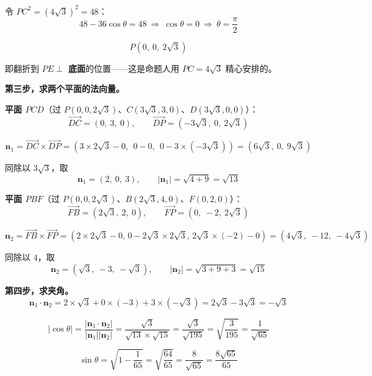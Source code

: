 \begin{answer}
令 $PC^{2}=\left(4\sqrt3\right)^{2}=48$：
\nopagebreak[4]
\[48-36\cos\theta=48\ \Longrightarrow\ \cos\theta=0\ \Longrightarrow\ \theta=\frac\pi2\]

\nopagebreak[4]
\[\boxed{P\left(0,\ 0,\ 2\sqrt3\right)}\]

即翻折到 \textbf{$PE\perp$ 底面}的位置——这是命题人用 $PC=4\sqrt3$ 精心安排的。

\textbf{第三步，求两个平面的法向量。}

\textbf{平面 $PCD$}（过 $P(0,0,2\sqrt3)$、$C\left(3\sqrt3,3,0\right)$、$D\left(3\sqrt3,0,0\right)$）：
\nopagebreak[4]
\[\overrightarrow{DC}=(0,\ 3,\ 0),\qquad\overrightarrow{DP}=\left(-3\sqrt3,\ 0,\ 2\sqrt3\right)\]

\nopagebreak[4]
\[\boldsymbol n_1=\overrightarrow{DC}\times\overrightarrow{DP}=\left(3\times2\sqrt3-0,\ \ 0-0,\ \ 0-3\times\left(-3\sqrt3\right)\right)=\left(6\sqrt3,\ 0,\ 9\sqrt3\right)\]

同除以 $3\sqrt3$，取
\nopagebreak[4]
\[\boldsymbol n_1=(2,\ 0,\ 3),\qquad\left|\boldsymbol n_1\right|=\sqrt{4+9}=\sqrt{13}\]

\textbf{平面 $PBF$}（过 $P(0,0,2\sqrt3)$、$B\left(2\sqrt3,4,0\right)$、$F(0,2,0)$）：
\nopagebreak[4]
\[\overrightarrow{FB}=\left(2\sqrt3,\ 2,\ 0\right),\qquad\overrightarrow{FP}=\left(0,\ -2,\ 2\sqrt3\right)\]

\nopagebreak[4]
\[\boldsymbol n_2=\overrightarrow{FB}\times\overrightarrow{FP}=\left(2\times2\sqrt3-0,\,0-2\sqrt3\times2\sqrt3,\,2\sqrt3\times(-2)-0\right)=\left(4\sqrt3,\ -12,\ -4\sqrt3\right)\]

同除以 $4$，取
\nopagebreak[4]
\[\boldsymbol n_2=\left(\sqrt3,\ -3,\ -\sqrt3\right),\qquad\left|\boldsymbol n_2\right|=\sqrt{3+9+3}=\sqrt{15}\]

\textbf{第四步，求夹角。}
\nopagebreak[4]
\[\boldsymbol n_1\cdot\boldsymbol n_2=2\times\sqrt3+0\times(-3)+3\times\left(-\sqrt3\right)=2\sqrt3-3\sqrt3=-\sqrt3\]

\nopagebreak[4]
\[\left|\cos\theta\right|=\frac{\left|\boldsymbol n_1\cdot\boldsymbol n_2\right|}{\left|\boldsymbol n_1\right|\left|\boldsymbol n_2\right|}=\frac{\sqrt3}{\sqrt{13}\times\sqrt{15}}=\frac{\sqrt3}{\sqrt{195}}=\sqrt{\frac3{195}}=\frac1{\sqrt{65}}\]

\nopagebreak[4]
\[\sin\theta=\sqrt{1-\frac1{65}}=\sqrt{\frac{64}{65}}=\frac8{\sqrt{65}}=\frac{8\sqrt{65}}{65}\]


\end{answer}
